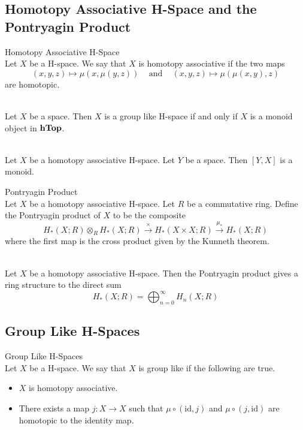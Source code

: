 \documentclass[a4paper]{article}
\begin{document}
\subsection{Homotopy Associative H-Space and the Pontryagin Product}
\begin{defn}{Homotopy Associative H-Space}{}\\
Let $X$ be a H-space. We say that $X$ is homotopy associative if the two maps $$(x,y,z)\mapsto\mu(x,\mu(y,z))\;\;\;\text{ and }\;\;\;(x,y,z)\mapsto\mu(\mu(x,y),z)$$ are homotopic. 
\end{defn}

\begin{lmm}{}{}\\
Let $X$ be a space. Then $X$ is a group like H-space if and only if $X$ is a monoid object in $\bold{hTop}$. 
\end{lmm}

\begin{lmm}{}{}\\
Let $X$ be a homotopy associative H-space. Let $Y$ be a space. Then $[Y,X]$ is a monoid. 
\end{lmm}

\begin{defn}{Pontryagin Product}{}\\
Let $X$ be a homotopy associative H-space. Let $R$ be a commutative ring. Define the Pontryagin product of $X$ to be the composite $$H_\ast(X;R)\otimes_RH_\ast(X;R)\overset{\times}{\to}H_\ast(X\times X;R)\overset{\mu_\ast}{\to}H_\ast(X;R)$$ where the first map is the cross product given by the Kunneth theorem. 
\end{defn}

\begin{prp}{}{}\\
Let $X$ be a homotopy associative H-space. Then the Pontryagin product gives a ring structure to the direct sum $$H_\ast(X;R)=\bigoplus_{n=0}^\infty H_n(X;R)$$
\end{prp}

\subsection{Group Like H-Spaces}
\begin{defn}{Group Like H-Spaces}{}\\
Let $X$ be a H-space. We say that $X$ is group like if the following are true. 
\begin{itemize}
\item $X$ is homotopy associative. 
\item There exists a map $j:X\to X$ such that $\mu\circ(\text{id},j)$ and $\mu\circ(j,\text{id})$ are homotopic to the identity map. 
\end{itemize}
\end{defn}
\end{document}
